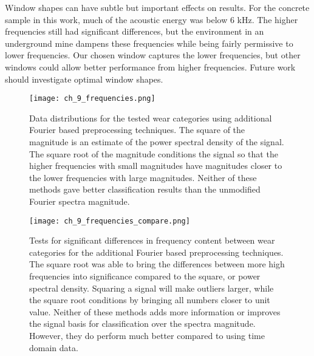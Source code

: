 Window shapes can have subtle but important effects on results.
For the concrete sample in this work, much of the acoustic energy was
below 6 kHz. The higher frequencies still had significant differences,
but the environment in an underground mine dampens these frequencies while
being fairly permissive to lower frequencies. 
Our chosen window captures the lower frequencies, but other windows
could allow better performance from higher frequencies.
Future work should investigate optimal window shapes.

\begin{figure}[t]
\centering
\texttt{[image: ch\_9\_frequencies.png]}
\caption{
Data distributions for the tested wear categories using additional Fourier based preprocessing techniques.
The square of the magnitude is an estimate of the power spectral density of the signal.
The square root of the magnitude conditions the signal so that the higher frequencies with small magnitudes
have magnitudes closer to the lower frequencies with large magnitudes.
Neither of these methods gave better classification results than the unmodified Fourier spectra magnitude.
}
\label{fig:basis}
\end{figure}

\begin{figure}[h]
\centering
\texttt{[image: ch\_9\_frequencies\_compare.png]}
\caption{
Tests for significant differences in frequency content between wear categories for the additional 
Fourier based preprocessing techniques. The square root was able to bring the differences between 
more high frequencies into significance compared to the square, or power spectral density. 
Squaring a signal will make outliers larger, while the square root conditions by bringing all numbers closer to unit value.
Neither of these methods adds more information or improves the signal basis for classification over the spectra magnitude. 
However, they do perform much better compared to using time domain data.
}
\label{fig:basis_compare}
\end{figure}

